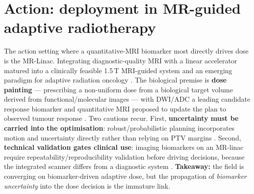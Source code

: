 \documentclass{iopjournal}
\begin{document}
\section{Action: deployment in MR-guided adaptive radiotherapy}
\label{sec:action}

The action setting where a quantitative-MRI biomarker most directly drives dose is the
MR-Linac. Integrating diagnostic-quality MRI with a linear accelerator
\cite{lagendijk2008,raaymakers2009} matured into a clinically feasible 1.5\,T MRI-guided
system \cite{raaymakers2017,lagendijk2014} and an emerging paradigm for adaptive
radiation oncology \cite{otazo2021,hall2022}. The biological premise is \textbf{dose
painting} --- prescribing a non-uniform dose from a biological target volume derived from
functional/molecular images
\cite{ling2000,bentzen2005,bentzen2011}%
{} --- with DWI/ADC a leading candidate response biomarker \cite{leibfarth2018} and
quantitative MRI proposed to update the plan to observed tumour response
\cite{vanhoudt2021,otazo2021}. Two cautions recur. First, \textbf{uncertainty must be
carried into the optimisation}: robust/probabilistic planning incorporates motion and
uncertainty directly rather than relying on PTV margins \cite{unkelbach2018}. Second,
\textbf{technical validation gates clinical use}: imaging biomarkers on an MR-linac
require repeatability/reproducibility validation before driving decisions, because the
integrated scanner differs from a diagnostic system
\cite{vanhoudt2021qib}.%
{} \textbf{Takeaway:} the field is converging on biomarker-driven adaptive dose, but the
propagation of \emph{biomarker uncertainty} into the dose decision is the immature link.
\end{document}
